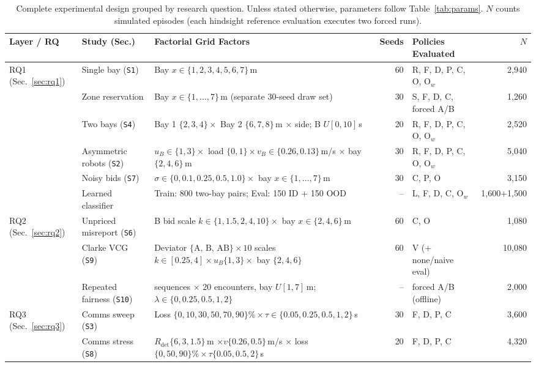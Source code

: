 \begin{table}[!t]\centering
\caption{Complete experimental design grouped by research question. Unless stated otherwise, parameters follow Table~\ref{tab:params}. $N$ counts simulated episodes (each hindsight reference evaluation executes two forced runs).}
\label{tab:design}
{\footnotesize\setlength{\tabcolsep}{3.4pt}
\begin{tabular}{@{}ll>{\raggedright\arraybackslash}p{}rlr@{}}\toprule
Layer / RQ & Study (Sec.) & Factorial Grid Factors & Seeds & Policies Evaluated & $N$ \\\midrule
\multirow{6}{*}{RQ1 (Sec.~\ref{sec:rq1})}
 & Single bay (\texttt{S1}) & Bay $x\in\{1,2,3,4,5,6,7\}$\,m & 60 & R, F, D, P, C, O, O$_w$ & 2,940 \\
 & Zone reservation & Bay $x\in\{1,\dots,7\}$\,m (separate 30-seed draw set) & 30 & S, F, D, C, forced A/B & 1,260 \\
 & Two bays (\texttt{S4}) & Bay 1 $\{2,3,4\}\times$ Bay 2 $\{6,7,8\}$\,m $\times$ side; B $U[0,10]$\,s & 20 & R, F, D, P, C, O, O$_w$ & 2,520 \\
 & Asymmetric robots (\texttt{S2}) & $u_B\in\{1,3\}\times$ load $\{0,1\}\times v_B\in\{0.26,0.13\}$\,m/s $\times$ bay $\{2,4,6\}$\,m & 30 & R, F, D, P, C, O, O$_w$ & 5,040 \\
 & Noisy bids (\texttt{S7}) & $\sigma\in\{0,0.1,0.25,0.5,1.0\}\times$ bay $x\in\{1,\dots,7\}$\,m & 30 & C, P, O & 3,150 \\
 & Learned classifier & Train: 800 two-bay pairs; Eval: 150 ID + 150 OOD & -- & L, F, D, C, O$_w$ & 1,600+1,500 \\\midrule
\multirow{3}{*}{RQ2 (Sec.~\ref{sec:rq2})}
 & Unpriced misreport (\texttt{S6}) & B bid scale $k\in\{1,1.5,2,4,10\}\times$ bay $x\in\{2,4,6\}$\,m & 60 & C, O & 1,080 \\
 & Clarke VCG (\texttt{S9}) & Deviator $\{\text{A, B, AB}\}\times 10$ scales $k\in[0.25,4]\times u_B\{1,3\}\times$ bay $\{2,4,6\}$ & 60 & V (+ none/naive eval) & 10,080 \\
 & Repeated fairness (\texttt{S10}) & 50 sequences $\times$ 20 encounters, bay $U[1,7]$\,m; $\lambda\in\{0,0.25,0.5,1,2\}$ & -- & forced A/B (offline) & 2,000 \\\midrule
\multirow{7}{*}{RQ3 (Sec.~\ref{sec:rq3})}
 & Comms sweep (\texttt{S3}) & Loss $\{0,10,30,50,70,90\}\%\times\tau\in\{0.05,0.25,0.5,1,2\}$\,s & 30 & F, D, P, C & 3,600 \\
 & Comms stress (\texttt{S8}) & $R_{\mathrm{det}}\{6,3,1.5\}$\,m $\times v\{0.26,0.5\}$\,m/s $\times$ loss $\{0,50,90\}\%\times\tau\{0.05,0.5,2\}$\,s & 20 & F, D, P, C & 4,320 \\

\end{tabular}}
\end{table}
